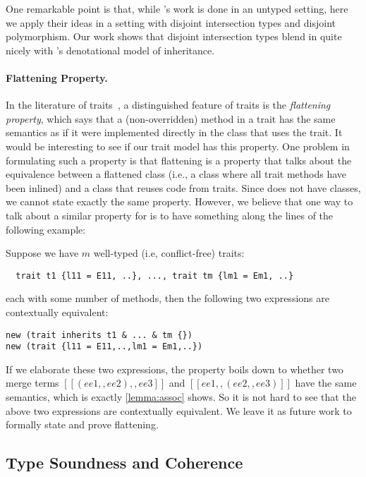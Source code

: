 One remarkable point is that, while \citeauthor{cook1989denotational}'s work is done in
an untyped setting, here we apply their ideas in a setting with
disjoint intersection types and disjoint polymorphism. Our work shows that
disjoint intersection types blend in quite nicely with \citeauthor{cook1989denotational}'s
denotational model of inheritance.

\paragraph{Flattening Property.}

In the literature of traits~\citep{Ducasse_2006, scharli2003traits, JOT:issue_2006_05/article4},
a distinguished feature of traits is the \emph{flattening property}, which says that a (non-overridden) method in a
trait has the same semantics as if it were implemented directly in the class
that uses the trait. It would be interesting to see if our trait model has this
property. One problem in formulating such a property is that flattening is a
property that talks about the equivalence between a flattened class (i.e., a
class where all trait methods have been inlined) and a class that reuses code
from traits. Since \sedel does not have classes, we cannot state exactly the same
property. However, we believe that one way to talk about a similar property for \sedel is to have something
along the lines of the following example:
\begin{example}[Flattening]
Suppose we have $m$ well-typed (i.e, conflict-free) traits:
\begin{lstlisting}
  trait t1 {l11 = E11, ..}, ..., trait tm {lm1 = Em1, ..}
\end{lstlisting}
each with some number of methods, then the following two expressions are contextually equivalent:
\begin{lstlisting}
new (trait inherits t1 & ... & tm {})
new (trait {l11 = E11,..,lm1 = Em1,..})
\end{lstlisting}
\end{example}
If we elaborate these two expressions, the property boils down to whether two
merge terms $[[(ee1 ,, ee2) ,, ee3]]$ and $[[ee1 ,, (ee2 ,, ee3)]]$ have the
same semantics, which is exactly \cref{lemma:assoc} shows. So it is not hard to
see that the above two expressions are contextually equivalent. We leave it as
future work to formally state and prove flattening.

\subsection{Type Soundness and Coherence}

